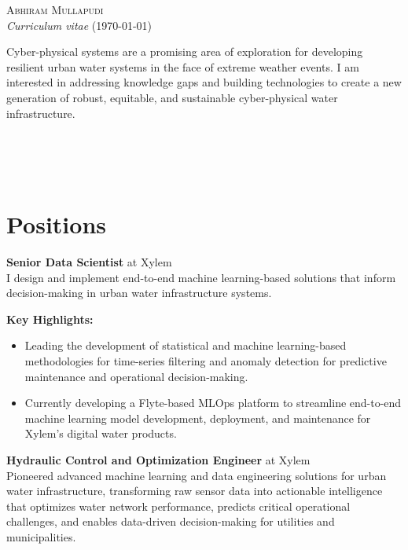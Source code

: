 \documentclass[a4paper,11pt]{article}
\newcommand{\years}[1]{%
  {\reversemarginpar\strut\marginnote{{\small#1}}}%
}
\begin{document}
{\huge \textsc{Abhiram Mullapudi}}\\
{\small \textit{Curriculum vitae} (\today)}\\

\begin{vwcol}[widths={0.78,0.22}]
{\footnotesize Cyber-physical systems are a promising area of exploration for developing resilient urban water
systems in the face of extreme weather events. I am interested in addressing knowledge gaps and building technologies to
create a new generation of robust, equitable, and sustainable cyber-physical water infrastructure.}

{\scriptsize {\\
{\faHome{}}\\
{\faGithub{}}\\}}
\end{vwcol}

\section*{Positions}

\years{2023--}
\textbf{Senior Data Scientist} at Xylem\\[0.1cm]
I design and implement end-to-end machine learning-based solutions that inform decision-making in urban water infrastructure systems.

\vspace{2mm}
{\small \textbf{Key Highlights:}}
\vspace{-2mm}
\begin{itemize}
	\setlength\itemsep{1mm}
	\item  Leading the development of statistical and machine learning-based methodologies for time-series filtering and anomaly detection for predictive maintenance and operational decision-making.
	\item  Currently developing a Flyte-based MLOps platform to streamline end-to-end machine learning model development, deployment, and maintenance for Xylem's digital water products.
\end{itemize}

\years{2020--2023}
\textbf{Hydraulic Control and Optimization Engineer} at Xylem\\[0.1cm]
Pioneered advanced machine learning and data engineering solutions for urban water infrastructure, transforming raw sensor data into actionable intelligence that optimizes water network performance, predicts critical operational challenges, and enables data-driven decision-making for utilities and municipalities.
\end{document}
